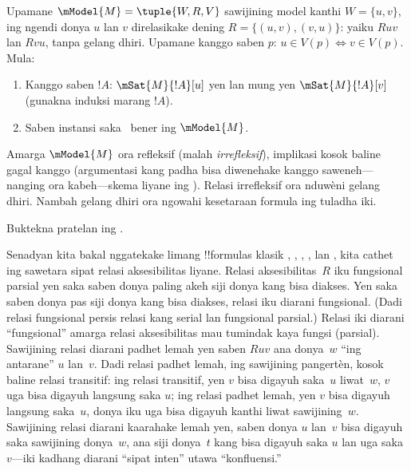 \documentclass[../../../include/open-logic-section]{subfiles}
\begin{document}
\begin{prop}
  Upamane $\mModel{M} = \tuple{W, R, V}$ sawijining model kanthi $W = \{u, v
  \}$, ing ngendi donya $u$ lan $v$ direlasikake dening $R = \{(u,v),(v,u)\}$:
  yaiku $Ruv$ lan $Rvu$, tanpa gelang dhiri. Upamane kanggo saben $p$:
  $u \in V(p) \Leftrightarrow v
  \in V(p)$. Mula:
  \begin{enumerate}
  \item Kanggo saben $!A$: $\mSat{M}{!A}[u]$ yen lan mung yen
    $\mSat{M}{!A}[v]$ (gunakna induksi marang $!A$).
  \item Saben instansi saka~ bener ing $\mModel{M}$.
  \end{enumerate}
  Amarga $\mModel{M}$ ora refleksif (malah
  \emph{irrefleksif}), implikasi kosok baline 
  gagal kanggo  (argumentasi kang padha bisa diwenehake kanggo
  saweneh---nanging ora kabeh---skema liyane ing
  ).
Relasi irrefleksif ora nduwèni gelang dhiri. Nambah gelang dhiri ora ngowahi kesetaraan formula ing tuladha iki.
\end{prop}

\begin{prob}
  Buktekna pratelan ing .
\end{prob}

Senadyan kita bakal nggatekake limang !!{formula}s klasik ,
, , , lan , kita cathet ing
 sawetara sipat relasi aksesibilitas liyane.
Relasi aksesibilitas~$R$ iku fungsional parsial yen saka saben donya
paling akeh siji donya kang bisa diakses. Yen saka saben donya pas siji
donya kang bisa diakses, relasi iku diarani fungsional. (Dadi relasi
fungsional persis relasi kang serial lan fungsional parsial.) Relasi
iki diarani ``fungsional'' amarga relasi aksesibilitas mau tumindak
kaya fungsi (parsial). Sawijining relasi diarani padhet lemah yen
saben $Ruv$ ana donya~$w$ ``ing antarane'' $u$ lan~$v$. Dadi relasi
padhet lemah, ing sawijining pangertèn, kosok baline relasi transitif:
ing relasi transitif, yen $v$ bisa digayuh saka~$u$ liwat~$w$, $v$
uga bisa digayuh langsung saka $u$; ing relasi padhet lemah, yen $v$
bisa digayuh langsung saka~$u$, donya iku uga bisa digayuh kanthi liwat
sawijining~$w$. Sawijining relasi diarani kaarahake lemah yen, saben
donya $u$ lan~$v$ bisa digayuh saka sawijining donya~$w$, ana siji
donya~$t$ kang bisa digayuh saka $u$ lan uga saka~$v$---iki kadhang
diarani ``sipat inten'' utawa ``konfluensi.''
\end{document}
